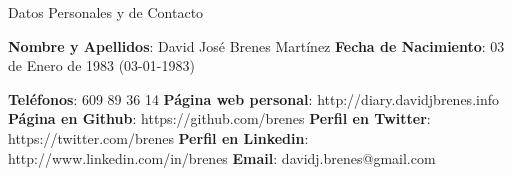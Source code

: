 
\begin{rubric}{Datos Personales y de Contacto}


  \entry*
  \textbf{Nombre y Apellidos}: David José Brenes Martínez
  \entry*
  \textbf{Fecha de Nacimiento}: 03 de Enero de 1983 (03-01-1983)


    \entry*
  \textbf{Teléfonos}: 609 89 36 14
    \entry*
  \textbf{Página web personal}: http://diary.davidjbrenes.info
  \entry*
  \textbf{Página en Github}: https://github.com/brenes
  \entry*
  \textbf{Perfil en Twitter}: https://twitter.com/brenes
  \entry*
  \textbf{Perfil en Linkedin}: http://www.linkedin.com/in/brenes
  \entry*
  \textbf{Email}: davidj.brenes@gmail.com



\end{rubric}


